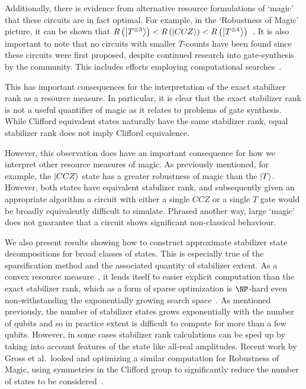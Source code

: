 Additionally, there is evidence from alternative resource formulations of `magic' that these circuits are in fact optimal. For example, in the `Robustness of Magic' picture, it can be shown that $R\left(\ket{T^{\otimes 3}}\right)<R\left(\ket{CCZ}\right)<R\left(\ket{T^{\otimes 4}}\right)$~\cite{Howard2017}. It is also important to note that no circuits with smaller $T$-counts have been found since these circuits were first proposed, despite continued research into gate-synthesis by the community. This includes efforts employing computational searches~\cite{Heyfron2018}.\par
This has important consequences for the interpretation of the exact stabilizer rank as a resource measure. In particular, it is clear that the exact stabilizer rank is not a useful quantifier of magic as it relates to problems of gate synthesis. While Clifford equivalent states naturally have the same stabilizer rank, equal stabilizer rank does not imply Clifford equivalence.\par
However, this observation does have an important consequence for how we interpret other resource measures of magic. As previously mentioned, for example, the $\ket{CCZ}$ state has a greater robustness of magic than the $\ket{T}$. However, both states have equivalent stabilizer rank, and subsequently given an appropriate algorithm a circuit with either a single $CCZ$ or a single $T$ gate would be broadly equivalently difficult to simulate. Phrased another way, large `magic' does not guarantee that a circuit shows significant non-classical behaviour.\par
We also present results showing how to construct approximate stabilizer state decompositions for broad classes of states. This is especially true of the sparsification method and the associated quantity of stabilizer extent. As a convex resource measure~\cite{Regula2018}, it lends itself to easier explicit computation than the exact stabilizer rank, which as a form of sparse optimization is $\NP$-hard even non-withstanding the exponentially growing search space~\cite{Natarajan1995}. As mentioned previously, the number of stabilizer states grows exponentially with the number of qubits and so in practice extent is difficult to compute for more than a few qubits. However, in some cases stabilizer rank calculations can be sped up by taking into account features of the state like all-real amplitudes. Recent work by Gross et al.\ looked and optimizing a similar computation for Robustness of Magic, using symmetries in the Clifford group to significantly reduce the number of states to be considered~\cite{Gross2017}.\par

